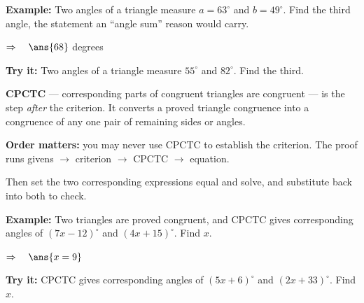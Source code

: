 \documentclass[12pt]{article}
\begin{document}
\begin{examplebox}
\textbf{Example:} \quad Two angles of a triangle measure $a = 63^\circ$ and $b = 49^\circ$. Find the third angle, the statement an ``angle sum'' reason would carry.

$\Rightarrow\quad \ans{68}$ degrees
\end{examplebox}

\begin{tryitbox}
\textbf{Try it:} \quad Two angles of a triangle measure $55^\circ$ and $82^\circ$. Find the third.\\[2pt]
\end{tryitbox}


\begin{formulabox}
\textbf{CPCTC} --- corresponding parts of congruent triangles are congruent --- is the step \emph{after} the criterion. It converts a proved triangle congruence into a congruence of any one pair of remaining sides or angles.\par
\textbf{Order matters:} you may never use CPCTC to establish the criterion. The proof runs givens $\rightarrow$ criterion $\rightarrow$ CPCTC $\rightarrow$ equation.\par
Then set the two corresponding expressions equal and solve, and substitute back into both to check.
\end{formulabox}

\begin{examplebox}
\textbf{Example:} \quad Two triangles are proved congruent, and CPCTC gives corresponding angles of $(7x - 12)^\circ$ and $(4x + 15)^\circ$. Find $x$.

$\Rightarrow\quad \ans{x = 9}$
\end{examplebox}

\begin{tryitbox}
\textbf{Try it:} \quad CPCTC gives corresponding angles of $(5x + 6)^\circ$ and $(2x + 33)^\circ$. Find $x$.\\[2pt]
\end{tryitbox}
\end{document}
